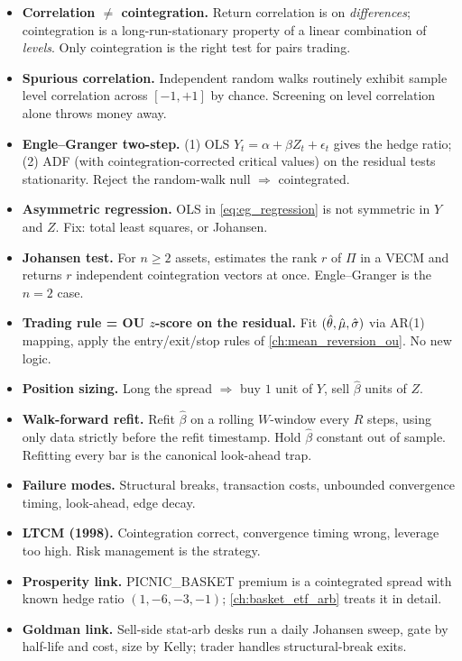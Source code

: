 \begin{itemize}
  \item \textbf{Correlation $\neq$ cointegration.} Return
  correlation is on \emph{differences}; cointegration is a
  long-run-stationary property of a linear combination of
  \emph{levels}. Only cointegration is the right test for pairs
  trading.
  \item \textbf{Spurious correlation.} Independent random walks
  routinely exhibit sample level correlation across $[-1, +1]$ by
  chance. Screening on level correlation alone throws money away.
  \item \textbf{Engle--Granger two-step.} (1) OLS
  $Y_t = \alpha + \beta Z_t + \epsilon_t$ gives the hedge ratio;
  (2) ADF (with cointegration-corrected critical values) on the
  residual tests stationarity. Reject the random-walk null
  $\Rightarrow$ cointegrated.
  \item \textbf{Asymmetric regression.} OLS in
  \eqref{eq:eg_regression} is not symmetric in $Y$ and $Z$. Fix:
  total least squares, or Johansen.
  \item \textbf{Johansen test.} For $n \geq 2$ assets, estimates
  the rank $r$ of $\Pi$ in a VECM and returns $r$ independent
  cointegration vectors at once. Engle--Granger is the $n=2$ case.
  \item \textbf{Trading rule = OU $z$-score on the residual.} Fit
  $(\hat\theta, \hat\mu, \hat{\sigma})$ via AR(1) mapping, apply the
  entry/exit/stop rules of \cref{ch:mean_reversion_ou}. No new
  logic.
  \item \textbf{Position sizing.} Long the spread $\Rightarrow$
  buy $1$ unit of $Y$, sell $\hat\beta$ units of $Z$.
  \item \textbf{Walk-forward refit.} Refit $\hat\beta$ on a
  rolling $W$-window every $R$ steps, using only data strictly
  before the refit timestamp. Hold $\hat\beta$ constant out of
  sample. Refitting every bar is the canonical look-ahead trap.
  \item \textbf{Failure modes.} Structural breaks, transaction
  costs, unbounded convergence timing, look-ahead, edge decay.
  \item \textbf{LTCM (1998).} Cointegration correct, convergence
  timing wrong, leverage too high. Risk management is the strategy.
  \item \textbf{Prosperity link.} PICNIC\_BASKET premium is a
  cointegrated spread with known hedge ratio $(1, -6, -3, -1)$;
  \cref{ch:basket_etf_arb} treats it in detail.
  \item \textbf{Goldman link.} Sell-side stat-arb desks run a
  daily Johansen sweep, gate by half-life and cost, size by Kelly;
  trader handles structural-break exits.
\end{itemize}
